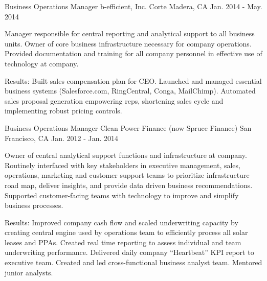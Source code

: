 \begin{cventries}
\cventry
{Business Operations Manager} %
{b-efficient, Inc.} %
{Corte Madera, CA} %
{Jan. 2014 - May. 2014} %
{ %
\begin{cvitems}
\item {Manager responsible for central reporting and analytical support to all business units. Owner of core business infrastructure necessary for company operations. Provided documentation and training for all company personnel in effective use of technology at company.}
\end{cvitems}
}
\begin{cvitemsnb}
\item {Results: Built sales compensation plan for CEO. Launched and managed essential business systems (Salesforce.com, RingCentral, Conga, MailChimp). Automated sales proposal generation empowering reps, shortening sales cycle and implementing robust pricing controls.}
\end{cvitemsnb}


\cventry
{Business Operations Manager} %
{Clean Power Finance (now Spruce Finance)} %
{San Francisco, CA} %
{Jan. 2012 - Jan. 2014} %
{ %
\begin{cvitems}
\item {Owner of central analytical support functions and infrastructure at company. Routinely interfaced with key stakeholders in executive management, sales, operations, marketing and customer support teams to prioritize infrastructure road map, deliver insights, and provide data driven business recommendations. Supported customer-facing teams with technology to improve and simplify business processes.}
\end{cvitems}
}
\begin{cvitemsnb}
\item {Results: Improved company cash flow and scaled underwriting capacity by creating central engine used by operations team to efficiently process all solar leases and PPAs. Created real time reporting to assess individual and team underwriting performance. Delivered daily company ``Heartbeat'' KPI report to executive team. Created and led cross-functional business analyst team. Mentored junior analysts.}
\end{cvitemsnb}


\end{cventries}
